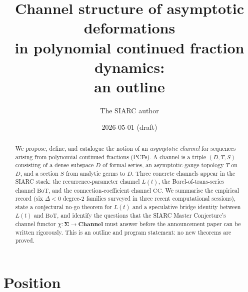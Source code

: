 \documentclass[11pt,reqno]{amsart}
\title[Channel structure of asymptotic deformations in PCF dynamics]
{Channel structure of asymptotic deformations\\ in polynomial continued fraction dynamics:\\ an outline}
\author{The SIARC author}
\date{2026-05-01 (draft)}
\theoremstyle{plain}
\theoremstyle{definition}
\theoremstyle{remark}
\newcommand{\Channel}{\mathbf{Channel}}
\newcommand{\Sigmaspace}{\mathbf{\Sigma}}
\newcommand{\Lt}{L(t)}
\newcommand{\BoT}{\mathrm{BoT}}
\newcommand{\CC}{\mathrm{CC}}
\begin{document}
\maketitle

\begin{abstract}
We propose, define, and catalogue the notion of an
\emph{asymptotic channel} for sequences arising from polynomial
continued fractions (PCFs). A channel is a triple $(D,T,S)$
consisting of a dense subspace $D$ of formal series, an
asymptotic-gauge topology $T$ on $D$, and a section $S$ from
analytic germs to $D$. Three concrete channels appear in the
SIARC stack: the recurrence-parameter channel $\Lt$, the
Borel-of-trans-series channel $\BoT$, and the
connection-coefficient channel $\CC$. We summarise the empirical
record (six $\Delta<0$ degree-$2$ families surveyed in three
recent computational sessions), state a conjectural no-go
theorem for $\Lt$ and a speculative bridge identity between
$\Lt$ and $\BoT$, and identify the questions that the SIARC
Master Conjecture's channel functor
$\chi : \Sigmaspace \to \Channel$ must answer before the
announcement paper can be written rigorously. This is an outline
and program statement: no new theorems are proved.
\end{abstract}

\tableofcontents

\section{Position}
\label{sec:position}
\end{document}
